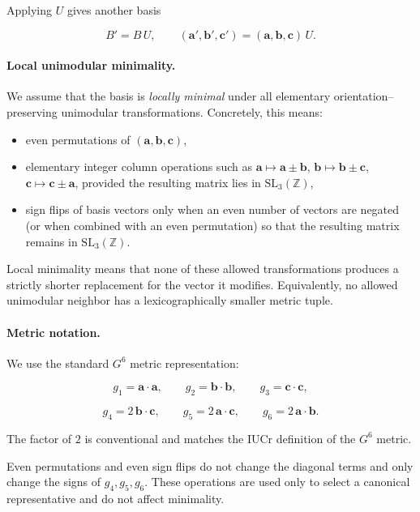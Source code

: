 \documentclass[preprint]{iucr}              %
\numberwithin{equation}{section}
\begin{document}
Applying $U$ gives another basis


\[
B' = B\,U,
\qquad
(\mathbf{a}',\mathbf{b}',\mathbf{c}') = (\mathbf{a},\mathbf{b},\mathbf{c})\,U.
\]



\paragraph{Local unimodular minimality.}
We assume that the basis is \emph{locally minimal} under all elementary
orientation–preserving unimodular transformations.  Concretely, this
means:

\begin{itemize}
	\item even permutations of $(\mathbf{a},\mathbf{b},\mathbf{c})$,
	\item elementary integer column operations such as
	$\mathbf{a} \mapsto \mathbf{a} \pm \mathbf{b}$,
	$\mathbf{b} \mapsto \mathbf{b} \pm \mathbf{c}$,
	$\mathbf{c} \mapsto \mathbf{c} \pm \mathbf{a}$,
	provided the resulting matrix lies in $\mathrm{SL}_3(\mathbb{Z})$,
	\item sign flips of basis vectors only when an even number of vectors
	are negated (or when combined with an even permutation) so that
	the resulting matrix remains in $\mathrm{SL}_3(\mathbb{Z})$.
\end{itemize}

Local minimality means that none of these allowed transformations
produces a strictly shorter replacement for the vector it modifies.
Equivalently, no allowed unimodular neighbor has a lexicographically
smaller metric tuple.

\paragraph{Metric notation.}
We use the standard $G^6$ metric representation:


\[
g_1 = \mathbf{a}\!\cdot\!\mathbf{a},\qquad
g_2 = \mathbf{b}\!\cdot\!\mathbf{b},\qquad
g_3 = \mathbf{c}\!\cdot\!\mathbf{c},
\]




\[
g_4 = 2\,\mathbf{b}\!\cdot\!\mathbf{c},\qquad
g_5 = 2\,\mathbf{a}\!\cdot\!\mathbf{c},\qquad
g_6 = 2\,\mathbf{a}\!\cdot\!\mathbf{b}.
\]


The factor of $2$ is conventional and matches the IUCr definition of the
$G^6$ metric.

Even permutations and even sign flips do not change the diagonal terms
and only change the signs of $g_4,g_5,g_6$.  These operations are used
only to select a canonical representative and do not affect minimality.
\end{document}
